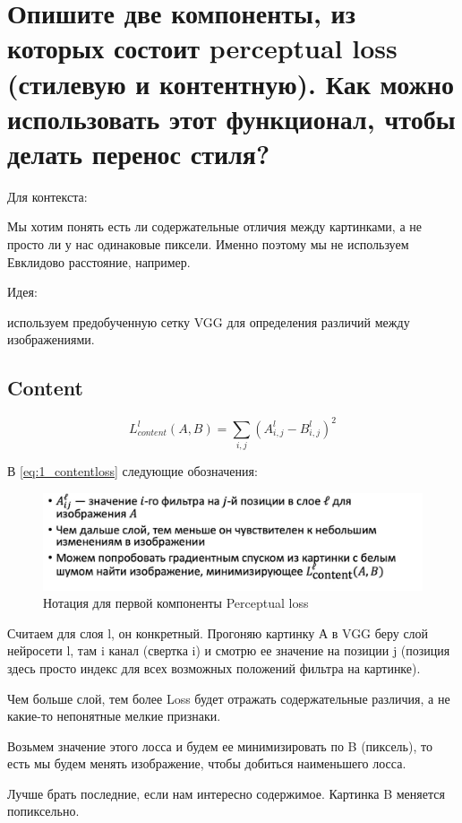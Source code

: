 	\section{Опишите две компоненты, из которых состоит perceptual loss (стилевую и контентную). Как можно использовать этот функционал, чтобы делать перенос стиля?}

	
	Для контекста: 
	
	Мы хотим понять есть ли содержательные отличия между картинками, а не просто ли у нас одинаковые пиксели. Именно поэтому мы не используем Евклидово расстояние, например.
	
	Идея: 
	
	используем предобученную сетку VGG для определения различий между изображениями. 
	
	\subsection{Content}
	
	\begin{equation}
	    L^{l}_{content}(A,B) = \sum_{i,j} (A^{l}_{i,j} -B^{l}_{i,j})^{2}
	    \label{eq:1_contentloss}
	\end{equation}
	
    	В  \ref{eq:1_contentloss} следующие обозначения: 
	
	\begin{figure}[H]
\centering
\includegraphics[width=0.7\linewidth]{1_contentnotation.jpg}
\caption{Нотация для первой компоненты Perceptual loss}
\label{fig:1_contentnotation}
\end{figure}
	
	Считаем для слоя l, он конкретный. Прогоняю картинку А в VGG беру слой нейросети l, там i канал (свертка i)  и смотрю ее значение на позиции j (позиция здесь просто индекс для всех возможных положений фильтра на картинке).
	
	Чем больше слой, тем более Loss будет отражать содержательные различия, а не какие-то непонятные мелкие признаки. 
	
	Возьмем значение этого лосса и будем ее минимизировать по B (пиксель), то есть мы будем менять изображение, чтобы добиться наименьшего лосса. 
	
	Лучше брать последние, если нам интересно содержимое. Картинка B меняется попиксельно. 
	
